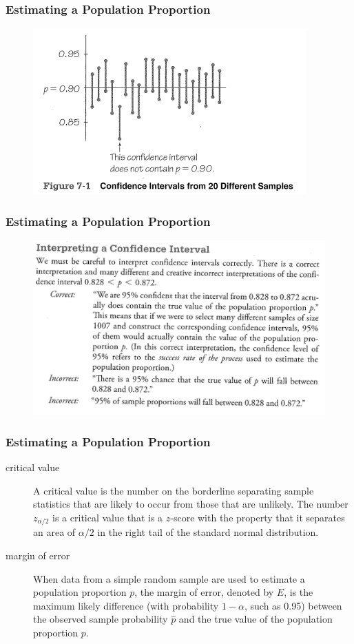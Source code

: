\documentclass[xcolor=dvipsnames]{beamer}
\begin{document}
\begin{frame}
  \frametitle{Estimating a Population Proportion}
\begin{figure}[h]
\includegraphics[scale=1]{./diagrams/triola-321.png}
\end{figure}
\end{frame}

\begin{frame}
  \frametitle{Estimating a Population Proportion}
\begin{figure}[h]
\includegraphics[scale=.8]{./diagrams/triola-320.png}
\end{figure}
\end{frame}

\begin{frame}
  \frametitle{Estimating a Population Proportion}
  \begin{description}
  \item[critical value] A critical value is the number on the
    borderline separating sample statistics that are likely to occur
    from those that are unlikely. The number $z_{\alpha/2}$ is a
    critical value that is a $z$-score with the property that it
    separates an area of $\alpha/2$ in the right tail of the standard
    normal distribution.
  \item[margin of error] When data from a simple random sample are
    used to estimate a population proportion $p$, the margin of error,
    denoted by $E$, is the maximum likely difference (with probability
    $1-\alpha$, such as 0.95) between the observed sample probability
    $\hat{p}$ and the true value of the population proportion $p$.
  \end{description}
\end{frame}
\end{document}
